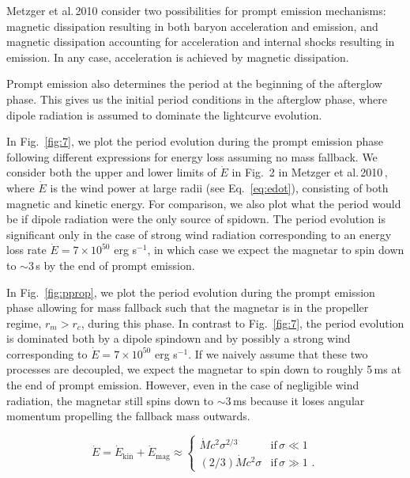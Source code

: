 \documentclass{article}
\begin{document}
Metzger et al.\,2010 \cite{Metzger:2010pp} consider two possibilities for prompt emission mechanisms: magnetic dissipation resulting in both baryon acceleration and emission, and magnetic dissipation accounting for acceleration and internal shocks resulting in emission. In any case, acceleration is achieved by magnetic dissipation.

Prompt emission also determines the period at the beginning of the afterglow phase. This gives us the initial period conditions in the afterglow phase, where dipole radiation is assumed to dominate the lightcurve evolution. 

In Fig.~\ref{fig:7}, we plot the period evolution during the prompt emission phase following different expressions for energy loss assuming no mass fallback. We consider both the upper and lower limits of $\dot{E}$ in Fig.~2 in Metzger et al.\,2010\,\cite{Metzger:2010pp}, where $\dot{E}$ is the wind power at large radii (see Eq.~\ref{eq:edot}), consisting of both magnetic and kinetic energy. For comparison, we also plot what the period would be if dipole radiation were the only source of spidown. The period evolution is significant only in the case of strong wind radiation corresponding to an energy loss rate $\dot{E} = 7 \times 10^{50}$ erg s$^{-1}$, in which case we expect the magnetar to spin down to $\sim 3$\,s by the end of prompt emission.

In Fig.~\ref{fig:pprop}, we plot the period evolution during the prompt emission phase allowing for mass fallback such that the magnetar is in the propeller regime, $r_m > r_c$, during this phase. In contrast to Fig.~\ref{fig:7}, the period evolution is dominated both by a dipole spindown and by possibly a strong wind corresponding to $\dot{E} = 7 \times 10^{50}$ erg s$^{-1}$. If we naively assume that these two processes are decoupled, we expect the magnetar to spin down to roughly 5\,ms at the end of prompt emission. However, even in the case of negligible wind radiation, the magnetar still spins down to $\sim 3$\,ms because it loses angular momentum propelling the fallback mass outwards.

\begin{equation}\label{eq:edot}
\dot{E} =\dot{E}_\mathrm{kin}+\dot{E}_\mathrm{mag} \approx
\begin{cases}
\dot{M} c^2 \sigma^{2/3}& \text{if}\, \sigma \ll 1 \\
(2/3) \dot{M} c^2 \sigma & \text{if}\, \sigma \gg 1\,\,.
\end{cases}
\end{equation}
\end{document}
